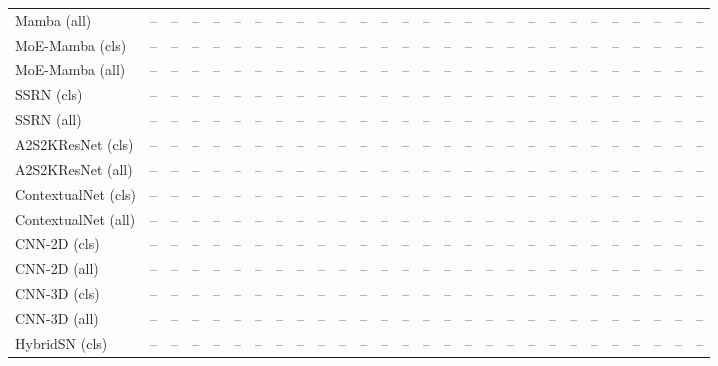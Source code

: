 \begin{longtable}{lrrrrrrrrrrrrrrrrrrrrrrrrrrr}
Mamba (all) & -- & -- & -- & -- & -- & -- & -- & -- & -- & -- & -- & -- & -- & -- & -- & -- & -- & -- & -- & -- & -- & -- & -- & -- & -- & -- & --\\
\addlinespace
MoE-Mamba (cls) & -- & -- & -- & -- & -- & -- & -- & -- & -- & -- & -- & -- & -- & -- & -- & -- & -- & -- & -- & -- & -- & -- & -- & -- & -- & -- & --\\*
MoE-Mamba (all) & -- & -- & -- & -- & -- & -- & -- & -- & -- & -- & -- & -- & -- & -- & -- & -- & -- & -- & -- & -- & -- & -- & -- & -- & -- & -- & --\\
\addlinespace
SSRN (cls) & -- & -- & -- & -- & -- & -- & -- & -- & -- & -- & -- & -- & -- & -- & -- & -- & -- & -- & -- & -- & -- & -- & -- & -- & -- & -- & --\\*
SSRN (all) & -- & -- & -- & -- & -- & -- & -- & -- & -- & -- & -- & -- & -- & -- & -- & -- & -- & -- & -- & -- & -- & -- & -- & -- & -- & -- & --\\
\addlinespace
A2S2KResNet (cls) & -- & -- & -- & -- & -- & -- & -- & -- & -- & -- & -- & -- & -- & -- & -- & -- & -- & -- & -- & -- & -- & -- & -- & -- & -- & -- & --\\*
A2S2KResNet (all) & -- & -- & -- & -- & -- & -- & -- & -- & -- & -- & -- & -- & -- & -- & -- & -- & -- & -- & -- & -- & -- & -- & -- & -- & -- & -- & --\\
\addlinespace
ContextualNet (cls) & -- & -- & -- & -- & -- & -- & -- & -- & -- & -- & -- & -- & -- & -- & -- & -- & -- & -- & -- & -- & -- & -- & -- & -- & -- & -- & --\\*
ContextualNet (all) & -- & -- & -- & -- & -- & -- & -- & -- & -- & -- & -- & -- & -- & -- & -- & -- & -- & -- & -- & -- & -- & -- & -- & -- & -- & -- & --\\
\addlinespace
CNN-2D (cls) & -- & -- & -- & -- & -- & -- & -- & -- & -- & -- & -- & -- & -- & -- & -- & -- & -- & -- & -- & -- & -- & -- & -- & -- & -- & -- & --\\*
CNN-2D (all) & -- & -- & -- & -- & -- & -- & -- & -- & -- & -- & -- & -- & -- & -- & -- & -- & -- & -- & -- & -- & -- & -- & -- & -- & -- & -- & --\\
\addlinespace
CNN-3D (cls) & -- & -- & -- & -- & -- & -- & -- & -- & -- & -- & -- & -- & -- & -- & -- & -- & -- & -- & -- & -- & -- & -- & -- & -- & -- & -- & --\\*
CNN-3D (all) & -- & -- & -- & -- & -- & -- & -- & -- & -- & -- & -- & -- & -- & -- & -- & -- & -- & -- & -- & -- & -- & -- & -- & -- & -- & -- & --\\
\addlinespace
HybridSN (cls) & -- & -- & -- & -- & -- & -- & -- & -- & -- & -- & -- & -- & -- & -- & -- & -- & -- & -- & -- & -- & -- & -- & -- & -- & -- & -- & --\\*

\end{longtable}
